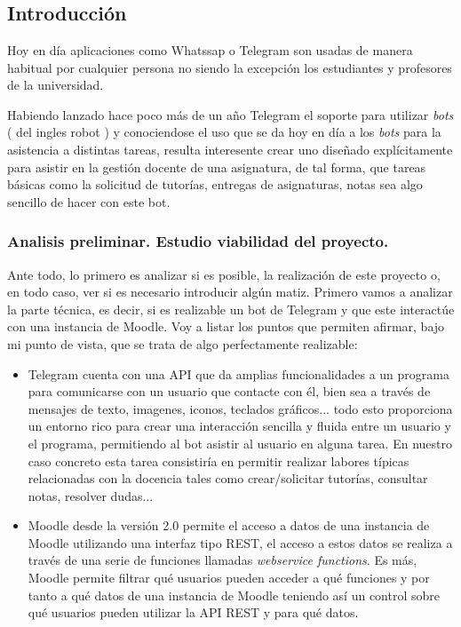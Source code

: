 \chapter{}



\section{Introducción}

Hoy en día aplicaciones como Whatssap o Telegram son usadas de manera habitual por cualquier persona no siendo la excepción los estudiantes y profesores de la universidad.

\par
Habiendo lanzado hace poco más de un año Telegram el soporte para utilizar \textit{bots} ( del ingles robot ) y conociendose el uso que se da hoy en día a los \textit{bots} para la asistencia a distintas tareas,  resulta interesente crear uno diseñado explícitamente para asistir en la gestión docente de una asignatura, de tal forma, que tareas básicas como la solicitud de tutorías, entregas de asignaturas, notas sea algo sencillo de hacer con este bot.

\subsection{Analisis preliminar. Estudio viabilidad del proyecto.}

Ante todo, lo primero es analizar si es posible, la realización de este proyecto o, en todo caso, ver si es necesario introducir algún matiz. Primero vamos a analizar la parte técnica, es decir, si es realizable un bot de Telegram y que este interactúe con una instancia de Moodle. Voy a listar los puntos que permiten afirmar, bajo mi punto de vista, que se trata de algo perfectamente realizable:

\begin{itemize}
\item Telegram cuenta con una API\cite{telegram1} que da amplias funcionalidades a un programa para comunicarse con un usuario que contacte con él, bien sea a través de mensajes de texto, imagenes, iconos, teclados gráficos... todo esto proporciona un entorno rico para crear una interacción  sencilla y fluida entre un usuario y el programa, permitiendo al bot asistir al usuario en alguna tarea. En nuestro caso concreto esta tarea consistiría en permitir  realizar labores típicas relacionadas con la docencia tales como crear/solicitar tutorías, consultar notas, resolver dudas... 
\item Moodle desde la versión 2.0 permite el acceso a datos de una instancia de Moodle utilizando una interfaz tipo REST, el acceso a estos datos se realiza a través de una serie de funciones llamadas \textit{webservice functions}. \cite{moodle0} Es más, Moodle permite filtrar qué usuarios pueden acceder a qué funciones y por tanto a qué datos de una instancia de Moodle \cite{moodle1} teniendo así un control sobre qué usuarios pueden utilizar la API REST y para qué datos.
\end{itemize}

